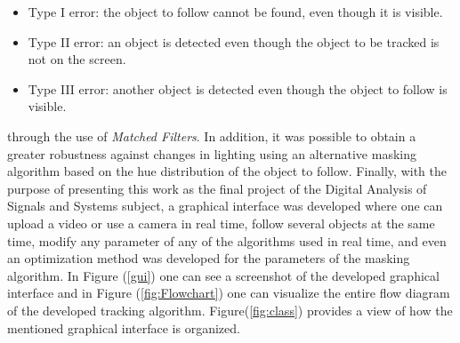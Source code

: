 \begin{itemize}
\item Type I error: the object to follow cannot be found, even though it is visible.
\item Type II error: an object is detected even though the object to be tracked is not on the screen.
\item Type III error: another object is detected even though the object to follow is visible.
\end{itemize}
through the use of \textit{Matched Filters}. In addition, it was possible to obtain a greater robustness against changes in lighting using an alternative masking algorithm based on the hue distribution of the object to follow. Finally, with the purpose of presenting this work as the final project of the Digital Analysis of Signals and Systems subject, a graphical interface was developed where one can upload a video or use a camera in real time, follow several objects at the same time, modify any parameter of any of the algorithms used in real time, and even an optimization method was developed for the parameters of the masking algorithm. In Figure (\ref{gui}) one can see a screenshot of the developed graphical interface and in Figure (\ref{fig:Flowchart}) one can visualize the entire flow diagram of the developed tracking algorithm. Figure(\ref{fig:class}) provides a view of how the mentioned graphical interface is organized.




